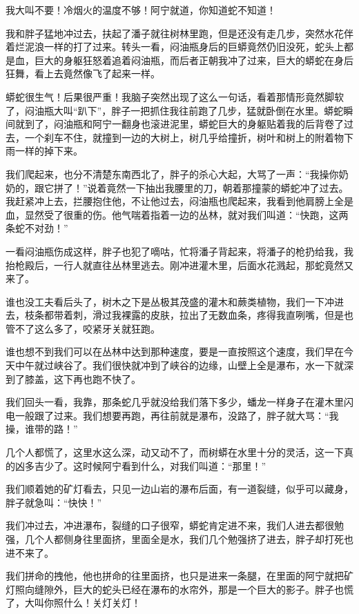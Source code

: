 我大叫不要！冷烟火的温度不够！阿宁就道，你知道蛇不知道！

我和胖子猛地冲过去，扶起了潘子就往树林里跑，但是还没有走几步，突然水花伴着烂泥浪一样的打了过来。转头一看，闷油瓶身后的巨蟒竟然仍旧没死，蛇头上都是血，巨大的身躯狂怒着追着闷油瓶，而后者正朝我冲了过来，巨大的蟒蛇在身后狂舞，看上去竟然像飞了起来一样。

蟒蛇很生气！后果很严重！我脑子突然出现了这么一句话，看着那情形竟然脚软了，闷油瓶大叫“趴下”，胖子一把抓住我往前跑了几步，猛就卧倒在水里。蟒蛇瞬间就到了，闷油瓶和阿宁一翻身也滚进泥里，蟒蛇巨大的身躯贴着我的后背卷了过去，一个刹车不住，就撞到一边的大树上，树几乎给撞折，树叶和树上的附着物下雨一样的掉下来。

我们爬起来，也分不清楚东南西北了，胖子的杀心大起，大骂了一声：“我操你奶奶的，跟它拼了！”说着竟然一下抽出我腰里的刀，朝着那撞蒙的蟒蛇冲了过去。我赶紧冲上去，拦腰抱住他，不让他过去，闷油瓶也爬起来，我看到他肩膀上全是血，显然受了很重的伤。他气喘着指着一边的丛林，就对我们叫道：“快跑，这两条蛇不对劲！”

一看闷油瓶伤成这样，胖子也犯了嘀咕，忙将潘子背起来，将潘子的枪扔给我，我抬枪殿后，一行人就直往丛林里逃去。刚冲进灌木里，后面水花溅起，那蛇竟然又来了。

谁也没工夫看后头了，树木之下是丛极其茂盛的灌木和蕨类植物，我们一下冲进去，枝条都带着刺，滑过我裸露的皮肤，拉出了无数血条，疼得我直咧嘴，但是也管不了这么多了，咬紧牙关就狂跑。

谁也想不到我们可以在丛林中达到那种速度，要是一直按照这个速度，我们早在今天中午就过峡谷了。我们很快就冲到了峡谷的边缘，山壁上全是瀑布，水一下就深到了膝盖，这下再也跑不快了。

我们回头一看，我靠，那条蛇几乎就没给我们落下多少，蟠龙一样身子在灌木里闪电一般跟了过来。我们想要再跑，再往前就是瀑布，没路了，胖子就大骂：“我操，谁带的路！”

几个人都慌了，这里水这么深，动又动不了，而树蟒在水里十分的灵活，这一下真的凶多吉少了。这时候阿宁看到什么，对我们叫道：“那里！”

我们顺着她的矿灯看去，只见一边山岩的瀑布后面，有一道裂缝，似乎可以藏身，胖子就急叫：“快快！”

我们冲过去，冲进瀑布，裂缝的口子很窄，蟒蛇肯定进不来，我们人进去都很勉强，几个人都侧身往里面挤，里面全是水，我们几个勉强挤了进去，胖子却打死也进不来了。

我们拼命的拽他，他也拼命的往里面挤，也只是进来一条腿，在里面的阿宁就把矿灯照向缝隙外，巨大的蛇头已经在瀑布的水帘外，那是一个巨大的影子。胖子也慌了，大叫你照什么！关灯关灯！

